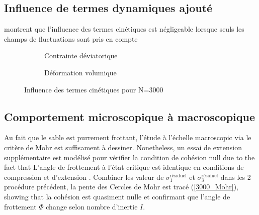 \documentclass[5p,authoryear,square]{elsarticle}
\begin{document}
\subsection{Influence de termes dynamiques ajouté}\label{termeDynamique}
 montrent que l'influence des termes cinétiques est négligeable lorsque seuls les champs de fluctuations sont pris en compte
\begin{figure}[htbp]
    \centering
    \begin{subfigure}{0.45\textwidth}
            \centering
        \scalebox{0.5}{}
        \caption{Contrainte déviatorique}
        \label{3000_kinetic_q}
    \end{subfigure}
    \hfill
    \begin{subfigure}[b]{0.45\textwidth}
            \centering
        \scalebox{0.5}{}
        \caption{Déformation volumique}
        \label{3000_kinetic_ev}
    \end{subfigure}
    \caption{Influence des termes cinétiques pour N=3000}
    \label{3000_kinetic_comp}
\end{figure}

\subsection{Comportement microscopique à macroscopique}\label{figureMuy}
Au fait que le sable est purrement frottant, l'étude à l'échelle macroscopic via le critère de Mohr est suffisament à dessiner.
Nonetheless, un essai de extension supplémentaire est modélisé pour vérifier la condition de cohésion null due to the fact that L'angle de frottement à l'état critique est identique en conditions de compression
et d'extension \citep{gens1982degree}.
Combiner les valeur de $\sigma_1^{\text{résiduel}}$ et $\sigma_3^{\text{résiduel}}$ dans les 2 procédure précédent, la pente des Cercles de Mohr est tracé (\cref{3000_Mohr}), showing that la cohésion est quasiment nulle et confirmant que l'angle de frottement $\Phi$ change selon nombre d'inertie $I$.
\end{document}
